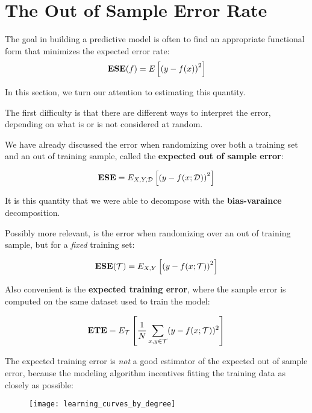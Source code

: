 \section{The Out of Sample Error Rate}
%
%
\begin{frame}
  The goal in building a predictive model is often to find an
  appropriate functional form that minimizes the expected error
  rate:
  $$\operatorname*{\mathbf{ESE}}(f) = E \left[ \left( y - f(x) \right)^2 \right]$$
\end{frame}
%
%
\begin{frame}
  In this section, we turn our attention to estimating this quantity.
\end{frame}
%
%
\begin{frame}
  The first difficulty is that there are different ways to interpret the error,
  depending on what is or is not considered at random.
\end{frame}
%
%
\begin{frame}
  We have already discussed the error when randomizing over both a training set
  and an out of training sample, called the \textbf{expected out of sample
  error}:

  $$\operatorname*{\mathbf{ESE}} = E_{X,Y,\operatorname*{\mathcal{D}}} \left[ \left( y - f(x; \operatorname*{\mathcal{D}}) \right)^2 \right]$$

  It is this quantity that we were able to decompose with the
  \textbf{bias-varaince} decomposition.
\end{frame}
%
%
\begin{frame}
  Possibly more relevant, is the error when randomizing over an out of training
  sample, but for a \textit{fixed} training set:

  $$\operatorname*{\mathbf{ESE}}(\operatorname*{\mathcal{T}}) = E_{X,Y} \left[ \left( y - f(x; \operatorname*{\mathcal{T}}) \right)^2 \right]$$
\end{frame}
%
%
\begin{frame}
  Also convenient is the \textbf{expected training error}, where the sample error is
  computed on the same dataset used to train the model:

  $$\operatorname*{\mathbf{ETE}} = E_{\operatorname*{\mathcal{T}}} \left[ \frac{1}{N} \sum_{x,y \in \operatorname*{\mathcal{T}}} (y - f(x; \operatorname*{\mathcal{T}}))^2 \right] $$
\end{frame}
%
%
\begin{frame}
  The expected training error is \textit{not} a good estimator of the expected
  out of sample error, because the modeling algorithm incentives fitting the
  training data as closely as possible:
  \begin{figure}
    \texttt{[image: learning\_curves\_by\_degree]}
  \end{figure}
\end{frame}
